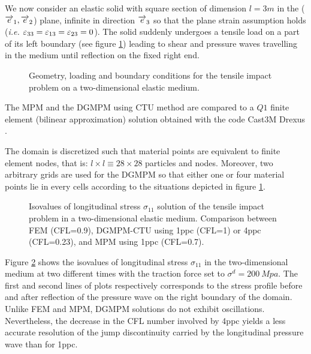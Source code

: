 We now consider an elastic solid with square section of dimension $l=3m$ in the (${\overrightarrow{e}}_1,{\overrightarrow{e}}_2$) plane, infinite in direction ${\overrightarrow{e}}_3$ so that the plane strain assumption holds (\textit{i.e. $\varepsilon_{33}=\varepsilon_{13}=\varepsilon_{23}=0$}). The solid suddenly undergoes a tensile load on a part of its left boundary (see figure \ref{fig:2D_planeStrain}) leading to shear and pressure waves travelling in the medium until reflection on the fixed right end.
\begin{figure}[h!]
  \centering
   \qquad
  \caption{Geometry, loading and boundary conditions for the tensile impact problem on a two-dimensional elastic medium.}
  \label{fig:2D_planeStrain}
\end{figure}
The MPM and the DGMPM using CTU method are compared to a $Q1$ finite element (bilinear approximation) solution obtained with the code Cast3M Drexus \cite{Castem}.

The domain is discretized such that material points are equivalent to finite element nodes, that is: $l\times l \equiv 28 \times 28$ particles and nodes. Moreover, two arbitrary grids are used for the DGMPM so that either one or four material points lie in every cells according to the situations depicted in figure \ref{fig:2D_planeStrain}.
\begin{figure}[h!]
  \centering
  
  \caption{Isovalues of longitudinal stress $\sigma_{11}$ solution of the tensile impact problem in a two-dimensional elastic medium. Comparison between FEM (CFL=0.9), DGMPM-CTU using 1ppc (CFL=1) or 4ppc (CFL=0.23), and MPM using 1ppc (CFL=0.7).}
  \label{fig:2delast_comparison}
\end{figure}
Figure \ref{fig:2delast_comparison} shows the isovalues of longitudinal stress $\sigma_{11}$ in the two-dimensional medium at two different times with the traction force set to $\sigma^d=200\: Mpa$. The first and second lines of plots respectively corresponds to the stress profile before and after reflection of the pressure wave on the right boundary of the domain.
Unlike FEM and MPM, DGMPM solutions do not exhibit oscillations. Nevertheless, the decrease in the CFL number involved by 4ppc yields a less accurate resolution of the jump discontinuity carried by the longitudinal pressure wave than for 1ppc.

